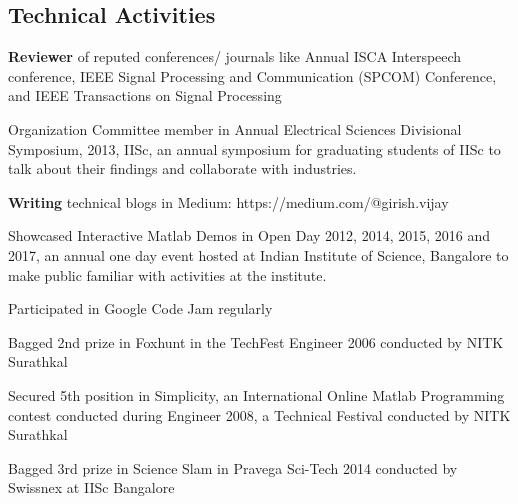 \documentclass[line]{resume}
\begin{document}
{\begin{resume}
			\section{\mysidestyle Technical Activities}
			\vspace{4.5mm}
			\begin{list2}
				\item \textbf{Reviewer} of reputed conferences/ journals like Annual ISCA Interspeech conference,  IEEE Signal Processing and Communication (SPCOM) Conference, and IEEE Transactions on Signal Processing
				\item Organization Committee member in Annual Electrical Sciences Divisional Symposium, 2013, IISc, an annual symposium for graduating students of IISc to talk
				about their findings and collaborate with industries.
				\item \textbf{Writing} technical blogs in Medium: https://medium.com/@girish.vijay
				\item Showcased Interactive Matlab Demos in Open Day 2012,  2014, 2015, 2016 and 2017, an annual one day event hosted at Indian Institute of Science, Bangalore to make public familiar with activities at the institute.	\item Participated in Google Code Jam regularly
				
				\item
				Bagged 2nd prize in Foxhunt in the TechFest Engineer 2006
				conducted by NITK Surathkal
				\item
				Secured 5th position in Simplicity, an International
				Online Matlab Programming contest conducted during
				Engineer 2008, a Technical Festival conducted by NITK
				Surathkal
				
				\item Bagged 3rd prize in Science Slam in Pravega Sci-Tech 2014 conducted by Swissnex at IISc Bangalore
				
			\end{list2}
		

\end{resume}}
\end{document}
